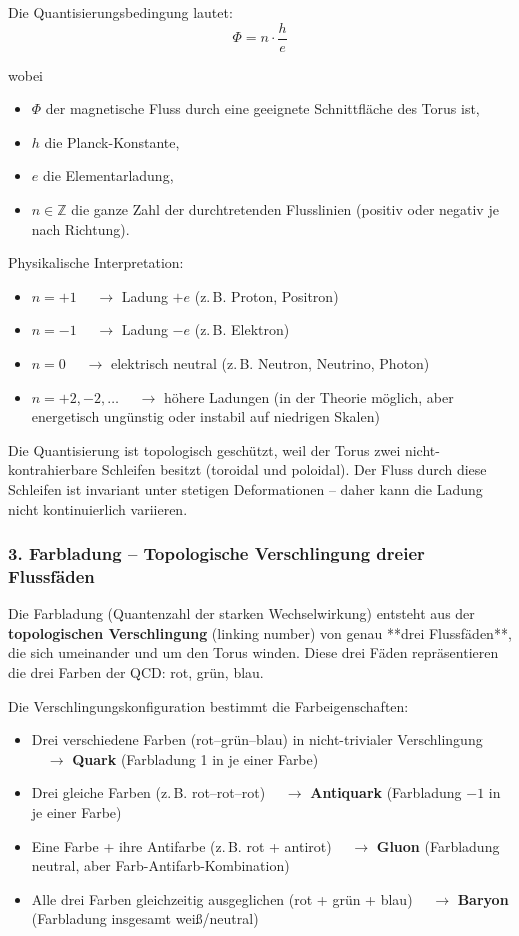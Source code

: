 \documentclass[12pt,a4paper]{article}
\begin{document}
	Die Quantisierungsbedingung lautet:
	\begin{equation}
		\Phi = n \cdot \frac{h}{e}
		\label{eq:flux_quantization}
	\end{equation}
	
	wobei
	\begin{itemize}
		\item $\Phi$ der magnetische Fluss durch eine geeignete Schnittfläche des Torus ist,
		\item $h$ die Planck-Konstante,
		\item $e$ die Elementarladung,
		\item $n \in \mathbb{Z}$ die ganze Zahl der durchtretenden Flusslinien (positiv oder negativ je nach Richtung).
	\end{itemize}
	
	Physikalische Interpretation:
	\begin{itemize}
		\item $n = +1$ $\quad \to$ Ladung $+e$ \quad (z.\,B. Proton, Positron)
		\item $n = -1$ $\quad \to$ Ladung $-e$ \quad (z.\,B. Elektron)
		\item $n = 0$   $\quad \to$ elektrisch neutral \quad (z.\,B. Neutron, Neutrino, Photon)
		\item $n = +2, -2, \dots$ $\quad \to$ höhere Ladungen (in der Theorie möglich, aber energetisch ungünstig oder instabil auf niedrigen Skalen)
	\end{itemize}
	
	Die Quantisierung ist topologisch geschützt, weil der Torus zwei nicht-kontrahierbare Schleifen besitzt (toroidal und poloidal). Der Fluss durch diese Schleifen ist invariant unter stetigen Deformationen – daher kann die Ladung nicht kontinuierlich variieren.
	
	\subsubsection{3. Farbladung – Topologische Verschlingung dreier Flussfäden}
	
	Die Farbladung (Quantenzahl der starken Wechselwirkung) entsteht aus der \textbf{topologischen Verschlingung} (linking number) von genau **drei Flussfäden**, die sich umeinander und um den Torus winden. Diese drei Fäden repräsentieren die drei Farben der QCD: rot, grün, blau.
	
	Die Verschlingungskonfiguration bestimmt die Farbeigenschaften:
	\begin{itemize}
		\item Drei verschiedene Farben (rot–grün–blau) in nicht-trivialer Verschlingung $\quad \to$ \textbf{Quark} \quad (Farbladung 1 in je einer Farbe)
		\item Drei gleiche Farben (z.\,B. rot–rot–rot) $\quad \to$ \textbf{Antiquark} \quad (Farbladung $-1$ in je einer Farbe)
		\item Eine Farbe + ihre Antifarbe (z.\,B. rot + antirot) $\quad \to$ \textbf{Gluon} \quad (Farbladung neutral, aber Farb-Antifarb-Kombination)
		\item Alle drei Farben gleichzeitig ausgeglichen (rot + grün + blau) $\quad \to$ \textbf{Baryon} \quad (Farbladung insgesamt weiß/neutral)
	\end{itemize}
	
\end{document}
